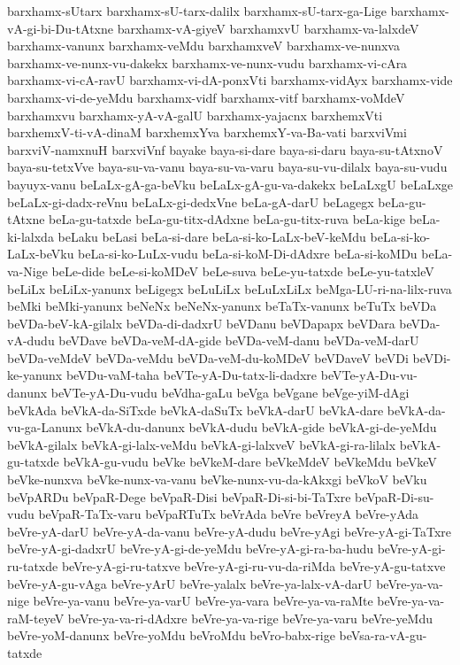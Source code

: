 {barxhamx-sUtarx
barxhamx-sU-tarx-dalilx
barxhamx-sU-tarx-ga-Lige
barxhamx-vA-gi-bi-Du-tAtxne
barxhamx-vA-giyeV
barxhamxvU
barxhamx-va-lalxdeV
barxhamx-vanunx
barxhamx-veMdu
barxhamxveV
barxhamx-ve-nunxva
barxhamx-ve-nunx-vu-dakekx
barxhamx-ve-nunx-vudu
barxhamx-vi-cAra
barxhamx-vi-cA-ravU
barxhamx-vi-dA-ponxVti
barxhamx-vidAyx
barxhamx-vide
barxhamx-vi-de-yeMdu
barxhamx-vidf
barxhamx-vitf
barxhamx-voMdeV
barxhamxvu
barxhamx-yA-vA-galU
barxhamx-yajacnx
barxhemxVti
barxhemxV-ti-vA-dinaM
barxhemxYva
barxhemxY-va-Ba-vati
barxviVmi
barxviV-namxnuH
barxviVnf
bayake
baya-si-dare
baya-si-daru
baya-su-tAtxnoV
baya-su-tetxVve
baya-su-va-vanu
baya-su-va-varu
baya-su-vu-dilalx
baya-su-vudu
bayuyx-vanu
beLaLx-gA-ga-beVku
beLaLx-gA-gu-va-dakekx
beLaLxgU
beLaLxge
beLaLx-gi-dadx-reVnu
beLaLx-gi-dedxVne
beLa-gA-darU
beLagegx
beLa-gu-tAtxne
beLa-gu-tatxde
beLa-gu-titx-dAdxne
beLa-gu-titx-ruva
beLa-kige
beLa-ki-lalxda
beLaku
beLasi
beLa-si-dare
beLa-si-ko-LaLx-beV-keMdu
beLa-si-ko-LaLx-beVku
beLa-si-ko-LuLx-vudu
beLa-si-koM-Di-dAdxre
beLa-si-koMDu
beLa-va-Nige
beLe-dide
beLe-si-koMDeV
beLe-suva
beLe-yu-tatxde
beLe-yu-tatxleV
beLiLx
beLiLx-yanunx
beLigegx
beLuLiLx
beLuLxLiLx
beMga-LU-ri-na-lilx-ruva
beMki
beMki-yanunx
beNeNx
beNeNx-yanunx
beTaTx-vanunx
beTuTx
beVDa
beVDa-beV-kA-gilalx
beVDa-di-dadxrU
beVDanu
beVDapapx
beVDara
beVDa-vA-dudu
beVDave
beVDa-veM-dA-gide
beVDa-veM-danu
beVDa-veM-darU
beVDa-veMdeV
beVDa-veMdu
beVDa-veM-du-koMDeV
beVDaveV
beVDi
beVDi-ke-yanunx
beVDu-vaM-taha
beVTe-yA-Du-tatx-li-dadxre
beVTe-yA-Du-vu-danunx
beVTe-yA-Du-vudu
beVdha-gaLu
beVga
beVgane
beVge-yiM-dAgi
beVkAda
beVkA-da-SiTxde
beVkA-daSuTx
beVkA-darU
beVkA-dare
beVkA-da-vu-ga-Lanunx
beVkA-du-danunx
beVkA-dudu
beVkA-gide
beVkA-gi-de-yeMdu
beVkA-gilalx
beVkA-gi-lalx-veMdu
beVkA-gi-lalxveV
beVkA-gi-ra-lilalx
beVkA-gu-tatxde
beVkA-gu-vudu
beVke
beVkeM-dare
beVkeMdeV
beVkeMdu
beVkeV
beVke-nunxva
beVke-nunx-va-vanu
beVke-nunx-vu-da-kAkxgi
beVkoV
beVku
beVpARDu
beVpaR-Dege
beVpaR-Disi
beVpaR-Di-si-bi-TaTxre
beVpaR-Di-su-vudu
beVpaR-TaTx-varu
beVpaRTuTx
beVrAda
beVre
beVreyA
beVre-yAda
beVre-yA-darU
beVre-yA-da-vanu
beVre-yA-dudu
beVre-yAgi
beVre-yA-gi-TaTxre
beVre-yA-gi-dadxrU
beVre-yA-gi-de-yeMdu
beVre-yA-gi-ra-ba-hudu
beVre-yA-gi-ru-tatxde
beVre-yA-gi-ru-tatxve
beVre-yA-gi-ru-vu-da-riMda
beVre-yA-gu-tatxve
beVre-yA-gu-vAga
beVre-yArU
beVre-yalalx
beVre-ya-lalx-vA-darU
beVre-ya-va-nige
beVre-ya-vanu
beVre-ya-varU
beVre-ya-vara
beVre-ya-va-raMte
beVre-ya-va-raM-teyeV
beVre-ya-va-ri-dAdxre
beVre-ya-va-rige
beVre-ya-varu
beVre-yeMdu
beVre-yoM-danunx
beVre-yoMdu
beVroMdu
beVro-babx-rige
beVsa-ra-vA-gu-tatxde
}
